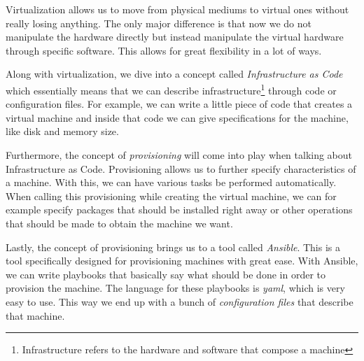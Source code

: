 Virtualization allows us to move from physical mediums to virtual ones
without really losing anything. The only major difference is that now
we do not manipulate the hardware directly but instead manipulate the
virtual hardware through specific software. This allows for great
flexibility in a lot of ways.

Along with virtualization, we dive into a concept called
\textit{Infrastructure as Code} which essentially means that we can
describe infrastructure\footnote{Infrastructure refers to the hardware
and software that compose a machine} through code or configuration
files. For example, we can write a little piece of code that creates a
virtual machine and inside that code we can give specifications for the
machine, like disk and memory size.

Furthermore, the concept of \textit{provisioning} will come into play
when talking about Infrastructure as Code. Provisioning allows us to
further specify characteristics of a machine. With this, we can have
various tasks be performed automatically. When calling this
provisioning while creating the virtual machine, we can for example
specify packages that should be installed right away or other
operations that should be made to obtain the machine we want.

Lastly, the concept of provisioning brings us to a tool called
\textit{Ansible}. This is a tool specifically designed for
provisioning machines with great ease. With Ansible, we can write
playbooks that basically say what should be done in order to provision
the machine. The language for these playbooks is \textit{yaml}, which
is very easy to use. This way we end up with a bunch of
\textit{configuration files} that describe that machine.

